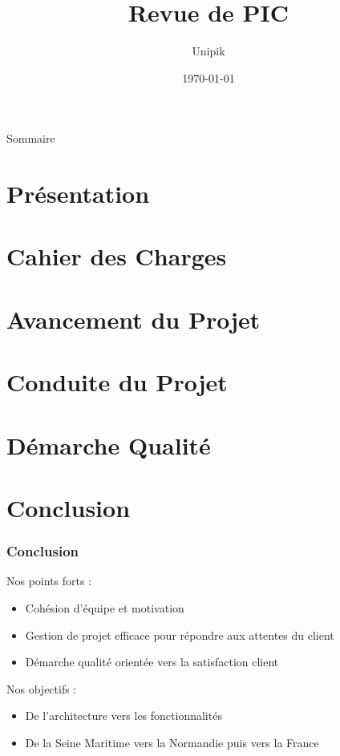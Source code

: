\documentclass[compress,xcolor=dvipsnames]{beamer}
\title{Revue de PIC}
\date{\today}
\author{Unipik}
\institute{\insa}
\begin{document}
\speaker{\Sergi} 

\begin{frame}[plain]
	\titlepage
\end{frame}

\begin{frame}{Sommaire}
	\tableofcontents[hideallsubsections]
\end{frame}
 

\speaker{\Sergi}
\section[Présentation]{Présentation}



\section[Cahier des charges]{Cahier des Charges}


\speaker{\Sergi}
\section[Avancement]{Avancement du Projet}


\speaker{\Sergi}
\section[Conduite du projet]{Conduite du Projet}



\speaker{\Sergi}
\section[Qualité]{Démarche Qualité}


\speaker{\Sergi}
\section[Conclusion]{Conclusion}
\begin{frame}
\frametitle{Conclusion}
Nos points forts :
\begin{itemize}
 \item Cohésion d'équipe et motivation
 \item Gestion de projet efficace pour répondre aux attentes du client
 \item Démarche qualité orientée vers la satisfaction client
\end{itemize}
Nos objectifs :
\begin{itemize} 
 \item De l'architecture vers les fonctionnalités
 \item De la Seine Maritime vers la Normandie puis vers la France
\end{itemize}
\end{frame}
\end{document}
